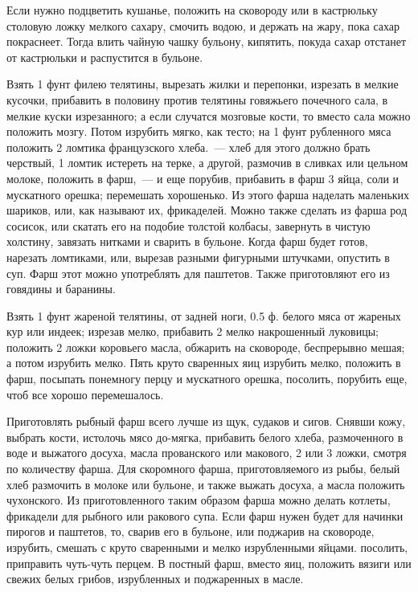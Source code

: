 
Если нужно подцветить кушанье, положить на сковороду или в кастрюльку столовую ложку мелкого сахару, смочить водою, и держать на жару, пока сахар покраснеет. Тогда влить чайную чашку бульону, кипятить, покуда сахар отстанет от кастрюльки и распустится в бульоне.


Взять 1 фунт филею телятины, вырезать жилки и перепонки, изрезать в мелкие кусочки, прибавить в половину против телятины говяжьего почечного сала, в мелкие куски изрезанного; а если случатся мозговые кости, то вместо сала можно положить мозгу. Потом изрубить мягко, как тесто; на 1 фунт рубленного мяса положить 2 ломтика французского хлеба.~--- хлеб для этого должно брать черствый, 1 ломтик истереть на терке, а другой, размочив в сливках или цельном молоке, положить в фарш,~--- и еще порубив, прибавить в фарш 3 яйца, соли и мускатного орешка; перемешать хорошенько. Из этого фарша наделать маленьких шариков, или, как называют их, фрикаделей. Можно также сделать из фарша род сосисок, или скатать его на подобие толстой колбасы, завернуть в чистую холстину, завязать нитками и сварить в бульоне. Когда фарш будет готов, нарезать ломтиками, или, вырезав разными фигурными штучками, опустить в суп. Фарш этот можно употреблять для паштетов. Также приготовляют его из говядины и баранины.


Взять 1 фунт жареной телятины, от задней ноги, 0.5 ф. белого мяса от жареных кур или индеек; изрезав мелко, прибавить 2 мелко накрошенный луковицы; положить 2 ложки коровьего масла, обжарить на сковороде, беспрерывно мешая; а потом изрубить мелко. Пять круто сваренных яиц изрубить мелко, положить в фарш, посыпать понемногу перцу и мускатного орешка, посолить, порубить еще, чтоб все хорошо перемешалось.


Приготовлять рыбный фарш всего лучше из щук, судаков и сигов. Снявши кожу, выбрать кости, истолочь мясо до-мягка, прибавить белого хлеба, размоченного в воде и выжатого досуха, масла прованского или макового, 2 или 3 ложки, смотря по количеству фарша. Для скоромного фарша, приготовляемого из рыбы, белый хлеб размочить в молоке или бульоне, и также выжать досуха, а масла положить чухонского. Из приготовленного таким образом фарша можно делать котлеты, фрикадели для рыбного или ракового супа. Если фарш нужен будет для начинки пирогов и паштетов, то, сварив его в бульоне, или поджарив на сковороде, изрубить, смешать с круто сваренными и мелко изрубленными яйцами. посолить, приправить чуть-чуть перцем. В постный фарш, вместо яиц, положить вязиги или свежих белых грибов, изрубленных и поджаренных в масле.


